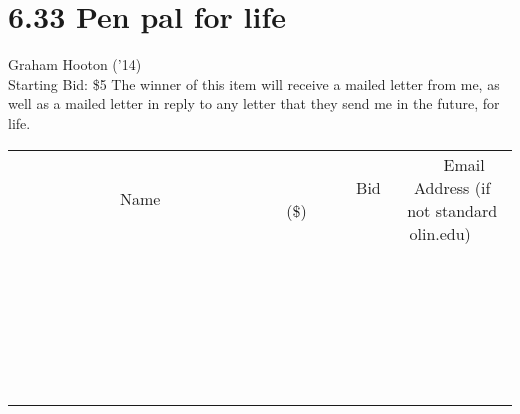 \documentclass[11pt]{article}
\begin{document}
\section*{6.33 Pen pal for life}
Graham Hooton ('14)
\\
Starting Bid: \$5
\newline
The winner of this item will receive a mailed letter from me, as well as a mailed letter in reply to any letter that they send me in the future, for life.
\\[6ex]
\begin{tabular}{c c c}
~~~~~~~~~~~~~Name~~~~~~~~~~~~~ & ~~~~~~~~~Bid (\$)~~~~~~~~~  & ~~~Email Address (if not standard olin.edu)~~~\\
 & & \\
\hline
 & & \\
\hline
 & & \\
\hline
 & & \\
\hline
 & & \\
\hline
 & & \\
\hline
 & & \\
\hline
 & & \\
\hline
 & & \\
\hline
 & & \\
\hline
 & & \\
\hline
 & & \\
\hline
 & & \\
\hline
 & & \\
\hline
 & & \\
\hline
 & & \\
\hline
 & & \\
\hline
 & & \\
\hline
 & & \\
\hline
 & & \\
\hline
 & & \\
\hline
 & & \\
\hline
 & & \\
\hline
 & & \\
\hline
 & & \\
\hline
 & & \\
\hline
\end{tabular}
\newpage
\end{document}
